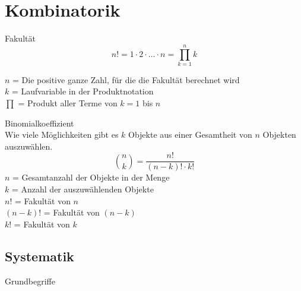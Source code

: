 \section{Kombinatorik}
\begin{definition}{Fakultät}\\
$$
n!=1 \cdot 2 \cdot \ldots \cdot n=\prod_{k=1}^{n} k
$$

   $n$ = Die positive ganze Zahl, für die die Fakultät berechnet wird\\
   $k$ = Laufvariable in der Produktnotation\\
   $\prod$ = Produkt aller Terme von $k=1$ bis $n$\\
\end{definition}

\begin{definition}{Binomialkoeffizient}\\
Wie viele Möglichkeiten gibt es $k$ Objekte aus einer Gesamtheit von $n$ Objekten auszuwählen.
$$
\binom{n}{k}=\frac{n!}{(n-k)!\cdot k!}
$$
   $n$ = Gesamtanzahl der Objekte in der Menge\\
   $k$ = Anzahl der auszuwählenden Objekte\\
   $n!$ = Fakultät von $n$\\
   $(n-k)!$ = Fakultät von $(n-k)$\\
   $k!$ = Fakultät von $k$\\
\end{definition}

\subsection{Systematik}
\begin{concept}{Grundbegriffe}\\
\begin{center}
\end{center}
\end{concept}
